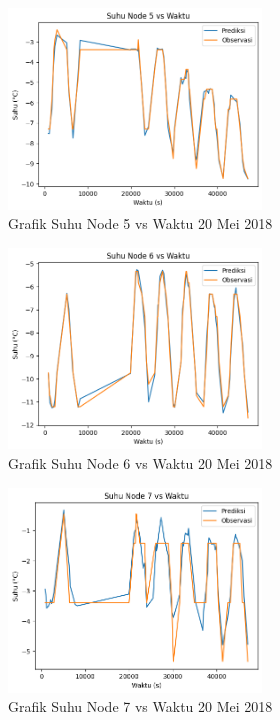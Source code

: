 \begin{figure}[H]
\setlength{}
\begin{center}
\includegraphics[width=0.6\textwidth]{fig/node5_temp_2018-05-20.png}
\caption{Grafik Suhu Node 5 vs Waktu 20 Mei 2018}
\label{fig:node520}
\end{center}
\end{figure}

\begin{figure}[H]
\setlength{}
\begin{center}
\includegraphics[width=0.6\textwidth]{fig/node6_temp_2018-05-20.png}
\caption{Grafik Suhu Node 6 vs Waktu 20 Mei 2018}
\label{fig:node620}
\end{center}
\end{figure}

\begin{figure}[H]
\setlength{}
\begin{center}
\includegraphics[width=0.6\textwidth]{fig/node7_temp_2018-05-20.png}
\caption{Grafik Suhu Node 7 vs Waktu 20 Mei 2018}
\label{fig:node720}
\end{center}
\end{figure}

